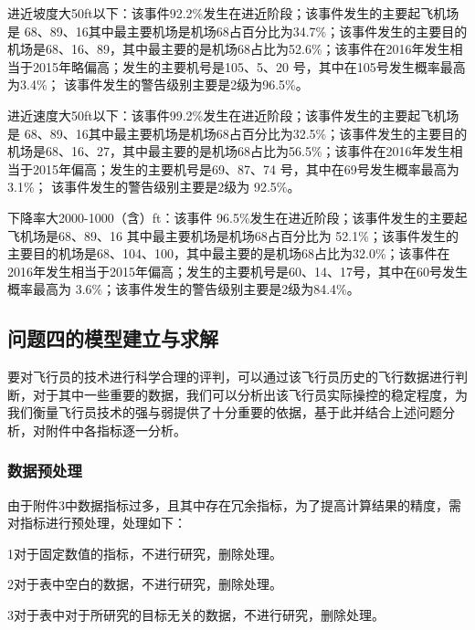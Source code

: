 \documentclass[UTF8]{ctexart}
\begin{document}
进近坡度大50ft以下：该事件92.2\%发生在进近阶段；该事件发生的主要起飞机场是 68、89、16其中最主要机场是机场68占百分比为34.7\%；该事件发生的主要目的机场是68、16、89，其中最主要的是机场68占比为52.6\%；该事件在2016年发生相当于2015年略偏高；发生的主要机号是105、5、20 号，其中在105号发生概率最高为3.4\%； 该事件发生的警告级别主要是2级为96.5\%。 \par
进近速度大50ft以下：该事件99.2\%发生在进近阶段；该事件发生的主要起飞机场是 68、89、16其中最主要机场是机场68占百分比为32.5\%；该事件发生的主要目的机场是68、16、27，其中最主要的是机场68占比为56.5\%；该事件在2016年发生相当于2015年偏高；发生的主要机号是69、87、74 号，其中在69号发生概率最高为3.1\%； 该事件发生的警告级别主要是2级为 92.5\%。 \par
下降率大2000-1000（含）ft：该事件 96.5\%发生在进近阶段；该事件发生的主要起飞机场是68、89、16 其中最主要机场是机场68占百分比为 52.1\%；该事件发生的主要目的机场是68、104、100，其中最主要的是机场68占比为32.0\%；该事件在2016年发生相当于2015年偏高；发生的主要机号是60、14、17号，其中在60号发生概率最高为 3.6\%；该事件发生的警告级别主要是2级为84.4\%。 \par
\subsection{问题四的模型建立与求解}
要对飞行员的技术进行科学合理的评判，可以通过该飞行员历史的飞行数据进行判断，对于其中一些重要的数据，我们可以分析出该飞行员实际操控的稳定程度，为我们衡量飞行员技术的强与弱提供了十分重要的依据，基于此并结合上述问题分析，对附件中各指标逐一分析。 \par
\subsubsection{数据预处理}
由于附件3中数据指标过多，且其中存在冗余指标，为了提高计算结果的精度，需对指标进行预处理，处理如下： \par
{1}对于固定数值的指标，不进行研究，删除处理。 \par
{2}对于表中空白的数据，不进行研究，删除处理。 \par
{3}对于表中对于所研究的目标无关的数据，不进行研究，删除处理。 \par
\end{document}
